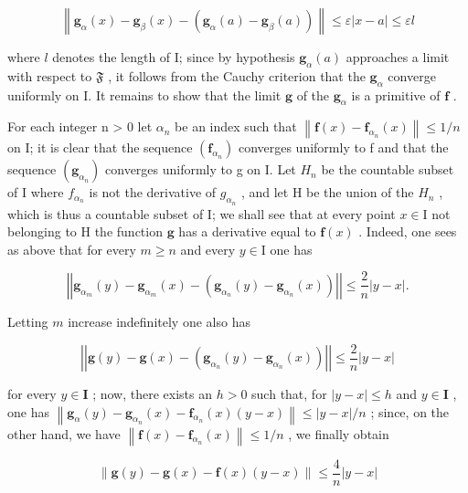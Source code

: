 \[
\left\| \mathbf {g} _ {\alpha} (x) - \mathbf {g} _ {\beta} (x) - (\mathbf {g} _ {\alpha} (a) - \mathbf {g} _ {\beta} (a)) \right\| \leqslant \varepsilon | x - a | \leqslant \varepsilon l
\]

where \(l\) denotes the length of I; since by hypothesis \(\mathbf{g}_{\alpha}(a)\) approaches a limit with respect to \(\mathfrak{F}\) , it follows from the Cauchy criterion that the \(\mathbf{g}_{\alpha}\) converge uniformly on I. It remains to show that the limit \(\mathbf{g}\) of the \(\mathbf{g}_{\alpha}\) is a primitive of \(\mathbf{f}\) .

For each integer n \textgreater{} 0 let \(\alpha_{n}\) be an index such that \(\left\|\mathbf{f}(x) - \mathbf{f}_{\alpha_{n}}(x)\right\| \leqslant 1/n\) on I; it is clear that the sequence \(\left(\mathbf{f}_{\alpha_{n}}\right)\) converges uniformly to f and that the sequence \(\left(\mathbf{g}_{\alpha_{n}}\right)\) converges uniformly to g on I. Let \(H_{n}\) be the countable subset of I where \(f_{\alpha_{n}}\) is not the derivative of \(g_{\alpha_{n}}\) , and let H be the union of the \(H_{n}\) , which is thus a countable subset of I; we shall see that at every point \(x \in \mathrm{I}\) not belonging to \(\mathrm{H}\) the function \(\mathbf{g}\) has a derivative equal to \(\mathbf{f}(x)\) . Indeed, one sees as above that for every \(m \geqslant n\) and every \(y \in \mathrm{I}\) one has

\[
\left| \left| \mathbf {g} _ {\alpha_ {m}} (y) - \mathbf {g} _ {\alpha_ {m}} (x) - \left(\mathbf {g} _ {\alpha_ {n}} (y) - \mathbf {g} _ {\alpha_ {n}} (x)\right) \right| \right| \leqslant \frac {2}{n} | y - x |.
\]

Letting \(m\) increase indefinitely one also has

\[
\left| \left| \mathbf {g} (y) - \mathbf {g} (x) - \left(\mathbf {g} _ {\alpha_ {n}} (y) - \mathbf {g} _ {\alpha_ {n}} (x)\right) \right| \right| \leqslant \frac {2}{n} | y - x |
\]

for every \(y \in \mathbf{I}\) ; now, there exists an \(h > 0\) such that, for \(|y - x| \leqslant h\) and \(y \in \mathbf{I}\) , one has \(\left\| \mathbf{g}_{\alpha}(y) - \mathbf{g}_{\alpha_n}(x) - \mathbf{f}_{\alpha_n}(x)(y - x) \right\| \leqslant |y - x| / n\) ; since, on the other hand, we have \(\left\| \mathbf{f}(x) - \mathbf{f}_{\alpha_n}(x) \right\| \leqslant 1 / n\) , we finally obtain

\[
\| \mathbf {g} (y) - \mathbf {g} (x) - \mathbf {f} (x) (y - x) \| \leqslant \frac {4}{n} | y - x |
\]

